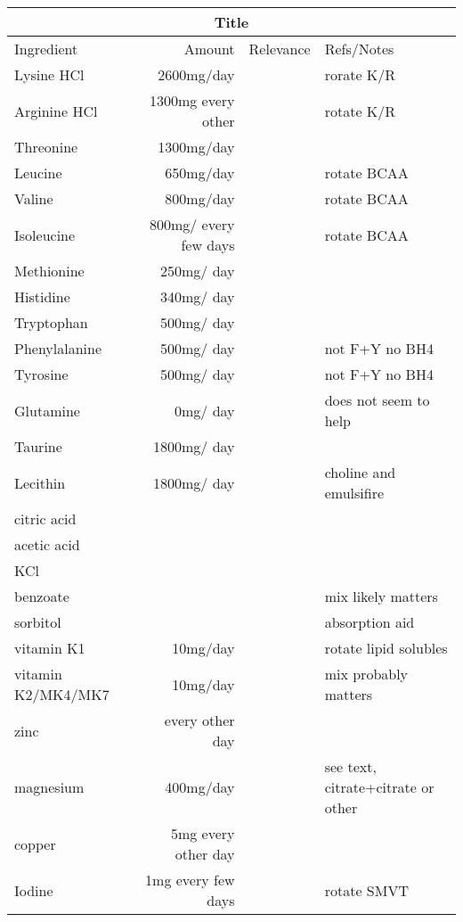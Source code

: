  \ifdefined\mjmstandalone%
%
\else%
\newcommand{\mjmstandalone}[1]{%
  \ifdefined\MJMTEXFRAG%
   #1%
  \fi%
}
  \fi%


\begin{table}[H] \centering
\begin{tabular}{|l|r|c|l|}
\hline
\multicolumn{4}{c}{Title}\\
\hline
Ingredient & Amount & Relevance & Refs/Notes \\
\hline
Lysine HCl  & 2600mg/day  & & rorate K/R  \\
Arginine  HCl  & 1300mg every other  & & rotate K/R \\
\hline
Threonine   & 1300mg/day  & & \\
\hline
Leucine   & 650mg/day  & & rotate BCAA  \\
Valine   & 800mg/day  & & rotate BCAA \\
Isoleucine   & 800mg/ every few days  & & rotate BCAA \\
\hline
Methionine  & 250mg/ day  & & \\
Histidine   & 340mg/ day  & & \\
Tryptophan   & 500mg/ day  & & \\
Phenylalanine   & 500mg/ day  & & not F+Y no BH4 \\
Tyrosine   & 500mg/ day  & & not F+Y no BH4 \\
Glutamine   & 0mg/ day  & & does not seem to help \\
\hline
Taurine  & 1800mg/ day  & & \\
Lecithin   & 1800mg/ day  & & choline and emulsifire  \\
citric acid    &   & &   \\
acetic acid    &   & &   \\
KCl    &   & &   \\
benzoate &&& mix likely matters \\
sorbitol &&&  absorption aid \\
\hline
vitamin K1   &   10mg/day   & & rotate lipid solubles    \\
vitamin K2/MK4/MK7  &   10mg/day   & & mix probably matters    \\
\hline
zinc  &  every other day    & &   \\
magnesium  & 400mg/day    & & see text, citrate+citrate or other   \\
copper  &  5mg every other day    & &   \\
Iodine   &  1mg every few days    & &  rotate SMVT  \\
\hline
\end{tabular}
\caption{}
\end{table}



